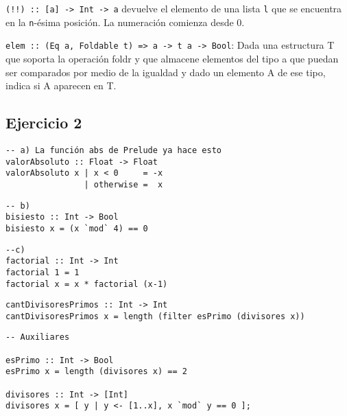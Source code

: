 \documentclass[10pt,a4paper]{article}
\begin{document}
\vspace*{5mm}
\texttt{(!!) :: [a] -> Int -> a} devuelve el elemento de una lista 
\texttt{l} que se encuentra en la \texttt{n}-ésima posición. La numeración comienza desde 0.

\vspace*{5mm}
\texttt{elem :: (Eq a, Foldable t) => a -> t a -> Bool}: Dada una estructura T que soporta la operación foldr y que almacene elementos del tipo a que puedan ser comparados por medio de la igualdad y dado un elemento A de ese tipo, indica si A aparecen en T.

\subsection{Ejercicio 2}
\begin{centrado}
\begin{verbatim}
-- a) La función abs de Prelude ya hace esto
valorAbsoluto :: Float -> Float
valorAbsoluto x | x < 0     = -x
                | otherwise =  x
\end{verbatim}
\end{centrado}
\begin{centrado}
	\begin{verbatim}
-- b) 
bisiesto :: Int -> Bool
bisiesto x = (x `mod` 4) == 0
	\end{verbatim}
\end{centrado}
\begin{centrado}
	\begin{verbatim}
--c)
factorial :: Int -> Int
factorial 1 = 1
factorial x = x * factorial (x-1)
	\end{verbatim}
\end{centrado}
\begin{centrado}
	\begin{verbatim}
cantDivisoresPrimos :: Int -> Int
cantDivisoresPrimos x = length (filter esPrimo (divisores x))
	\end{verbatim}
\end{centrado}

\begin{centrado}
	\begin{verbatim}
-- Auxiliares 

esPrimo :: Int -> Bool
esPrimo x = length (divisores x) == 2

divisores :: Int -> [Int]
divisores x = [ y | y <- [1..x], x `mod` y == 0 ];
	\end{verbatim}
\end{centrado}
\end{document}

